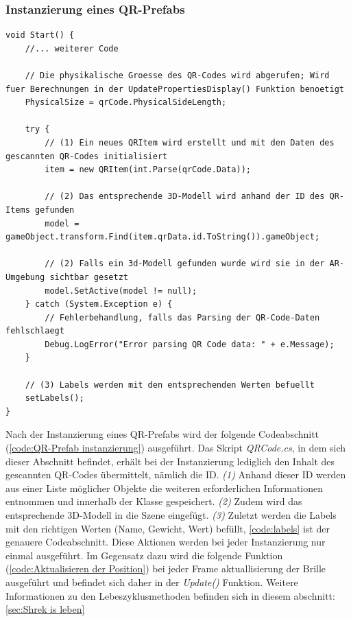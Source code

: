 \begin{itemize}
\subsubsection*{Instanzierung eines QR-Prefabs}

\begin{lstlisting}[style=csharp, caption={Instanzierung eines QR-Prefabs}, label=code:QR-Prefab instanzierung]
void Start() {
    //... weiterer Code

    // Die physikalische Groesse des QR-Codes wird abgerufen; Wird fuer Berechnungen in der UpdatePropertiesDisplay() Funktion benoetigt
    PhysicalSize = qrCode.PhysicalSideLength;

    try {
        // (1) Ein neues QRItem wird erstellt und mit den Daten des gescannten QR-Codes initialisiert
        item = new QRItem(int.Parse(qrCode.Data));

        // (2) Das entsprechende 3D-Modell wird anhand der ID des QR-Items gefunden
        model = gameObject.transform.Find(item.qrData.id.ToString()).gameObject;

        // (2) Falls ein 3d-Modell gefunden wurde wird sie in der AR-Umgebung sichtbar gesetzt
        model.SetActive(model != null);
    } catch (System.Exception e) {
        // Fehlerbehandlung, falls das Parsing der QR-Code-Daten fehlschlaegt
        Debug.LogError("Error parsing QR Code data: " + e.Message);
    }

    // (3) Labels werden mit den entsprechenden Werten befuellt
    setLabels();
}
\end{lstlisting}

Nach der Instanzierung eines QR-Prefabs wird der folgende Codeabschnitt (\ref{code:QR-Prefab instanzierung}) ausgeführt. Das Skript \textit{QRCode.cs}, in dem sich dieser Abschnitt befindet, erhält bei der Instanzierung lediglich den Inhalt des gescannten QR-Codes übermittelt, nämlich die ID. \textit{(1)} Anhand dieser ID werden aus einer Liste möglicher Objekte die weiteren erforderlichen Informationen entnommen und innerhalb der Klasse gespeichert. \textit{(2)} Zudem wird das entsprechende 3D-Modell in die Szene eingefügt. \textit{(3)} Zuletzt werden die Labels mit den richtigen Werten (Name, Gewicht, Wert) befüllt, \ref{code:labels} ist der genauere Codeabschnitt. Diese Aktionen werden bei jeder Instanzierung nur einmal ausgeführt. Im Gegensatz dazu wird die folgende Funktion (\ref{code:Aktualisieren der Position}) bei jeder Frame aktuallisierung der Brille ausgeführt und befindet sich daher in der \textit{Update()} Funktion. Weitere Informationen zu den Lebeszyklusmethoden befinden sich in diesem abschnitt: \ref{sec:Shrek is leben}


\end{itemize}
